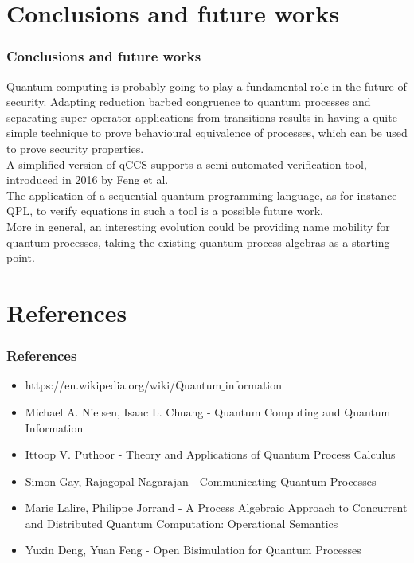 \documentclass{beamer}
\begin{document}
\section{Conclusions and future works}

\begin{frame}
\frametitle{Conclusions and future works}
Quantum computing is probably going to play a fundamental role in the future of security. Adapting reduction barbed congruence to quantum processes and separating super-operator applications from transitions results in having a quite simple technique to prove behavioural equivalence of processes, which can be used to prove security properties. \\
A simplified version of qCCS supports a semi-automated verification tool, introduced in 2016 by Feng et al. \\
The application of a sequential quantum programming language, as for instance QPL, to verify equations in such a tool is a possible future work. \\
More in general, an interesting evolution could be providing name mobility for quantum processes, taking the existing quantum process algebras as a starting point.
\end{frame}

\section{References}

\begin{frame}
\frametitle{References}
\begin{itemize}
	\item https://en.wikipedia.org/wiki/Quantum$\_$information
	\item Michael A. Nielsen, Isaac L. Chuang - Quantum Computing and Quantum Information
	\item Ittoop V. Puthoor - Theory and Applications of Quantum Process Calculus
	\item Simon Gay, Rajagopal Nagarajan - Communicating Quantum Processes
	\item Marie Lalire, Philippe Jorrand - A Process Algebraic Approach to Concurrent and
	Distributed Quantum Computation: Operational Semantics
	\item Yuxin Deng, Yuan Feng - Open Bisimulation for Quantum Processes
\end{itemize}
\end{frame}
\end{document}
